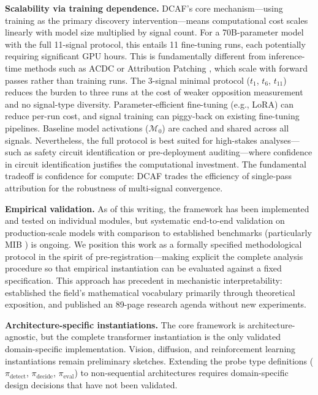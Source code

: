 \documentclass[11pt]{article}
\begin{document}
\textbf{Scalability via training dependence.} DCAF's core mechanism---using training as the primary discovery intervention---means computational cost scales linearly with model size multiplied by signal count. For a 70B-parameter model with the full 11-signal protocol, this entails 11 fine-tuning runs, each potentially requiring significant GPU hours. This is fundamentally different from inference-time methods such as ACDC \citep{conmy2023acdc} or Attribution Patching \citep{syed2024attribution}, which scale with forward passes rather than training runs. The 3-signal minimal protocol ($t_1$, $t_6$, $t_{11}$) reduces the burden to three runs at the cost of weaker opposition measurement and no signal-type diversity. Parameter-efficient fine-tuning (e.g., LoRA) can reduce per-run cost, and signal training can piggy-back on existing fine-tuning pipelines. Baseline model activations ($\mathcal{M}_0$) are cached and shared across all signals. Nevertheless, the full protocol is best suited for high-stakes analyses---such as safety circuit identification or pre-deployment auditing---where confidence in circuit identification justifies the computational investment. The fundamental tradeoff is confidence for compute: DCAF trades the efficiency of single-pass attribution for the robustness of multi-signal convergence.

\textbf{Empirical validation.} As of this writing, the framework has been implemented and tested on individual modules, but systematic end-to-end validation on production-scale models with comparison to established benchmarks (particularly MIB \citep{mueller2025mib}) is ongoing. We position this work as a formally specified methodological protocol in the spirit of pre-registration---making explicit the complete analysis procedure so that empirical instantiation can be evaluated against a fixed specification. This approach has precedent in mechanistic interpretability: \citet{elhage2021mathematical} established the field's mathematical vocabulary primarily through theoretical exposition, and \citet{sharkey2025openproblems} published an 89-page research agenda without new experiments.

\textbf{Architecture-specific instantiations.} The core framework is architecture-agnostic, but the complete transformer instantiation is the only validated domain-specific implementation. Vision, diffusion, and reinforcement learning instantiations remain preliminary sketches. Extending the probe type definitions ($\pi_{\text{detect}}$, $\pi_{\text{decide}}$, $\pi_{\text{eval}}$) to non-sequential architectures requires domain-specific design decisions that have not been validated.
\end{document}
